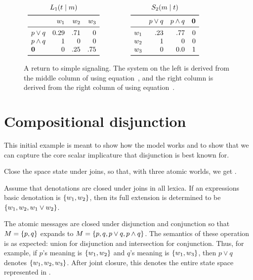 \documentclass{article}
\begin{document}
\begin{figure}[tp]
  \centering
  $\begin{array}[c]{c@{\hspace{45pt}}c}
     \ListenerK[1](\state\given\msg) & \SpeakerK[2](\msg\given\state) \\[1ex] %
     \listenerMatrix%
     {}%
     { 0.29 & .71 & 0}
     { 1 &   0 &  0}
     {0 &  .25 & .75}
     & 
     \speakerMatrix%
     {}%
     {.23 &  .77  &   0}%
     {1   &  0  &     0}%
     {0   &  0.0  &   1}
   \end{array}$
   \caption{A return to simple signaling. The system on the left is
     derived from the middle column of  using
     equation~, and the right column is derived from the
     right column of  using
     equation~.}
  \label{fig:simple}
\end{figure}



\section{Compositional disjunction}\label{sec:scalar-disj}

This initial example is meant to show how the model works and to show
that we can capture the core scalar implicature that disjunction is
best known for.

Close the space state under joins, so that, with three atomic worlds,
we get .

Assume that denotations are closed under joins in all lexica. If an
expressions basic denotation is $\left\{ w_{1}, w_{2} \right\}$, then its full
extension is determined to be $\left\{ w_{1}, w_{2}, w_{1} \vee w_{2} \right\}$.

The atomic messages are closed under disjunction and conjunction so
that $M = \left\{ p, q \right\}$ expands to
$M = \left\{ p, q, p \vee q, p \wedge q \right\}$. The semantics of these
operation is as expected: union for disjunction and intersection for
conjunction. Thus, for example, if $p$'s meaning is
$\left\{ w_{1}, w_{2} \right\}$ and $q$'s meaning is $\left\{ w_{1}, w_{3} \right\}$, then
$p \vee q$ denotes $\left\{ w_{1}, w_{2}, w_{3} \right\}$.  After joint closure,
this denotes the entire state space represented in
.
\end{document}
